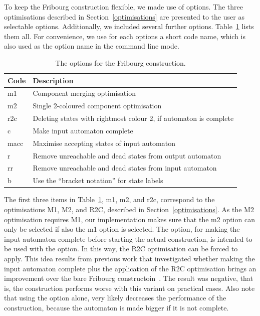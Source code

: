To keep the Fribourg construction flexible, we made use of options. The three optimisations described in Section~\ref{optimisations} are presented to the user as selectable options. Additionally, we included several further options. Table~\ref{goal_fribourg_options} lists them all. For convenience, we use for each options a short code name, which is also used as the option name in the command line mode.

\begin{table}
\caption{The options for the Fribourg construction.}
\begin{center}
\begin{tabular}{|l|l|}
\hline
Code & Description \\ \hline
m1 & Component merging optimisation \\ \hline
m2 & Single 2-coloured component optimisation \\ \hline
r2c & Deleting states with rightmost colour 2, if automaton is complete \\ \hline
c & Make input automaton complete \\ \hline
macc & Maximise accepting states of input automaton \\ \hline
r & Remove unreachable and dead states from output automaton \\ \hline
rr & Remove unreachable and dead states from input automaton \\ \hline
b & Use the ``bracket notation'' for state labels \\ \hline
\end{tabular}
\end{center}
\label{goal_fribourg_options}
\end{table}

The first three items in Table~\ref{goal_fribourg_options}, m1, m2, and r2c, correspond to the optimisations M1, M2, and R2C, described in Section~\ref{optimisations}. As the M2 optimisation requires M1, our implementation makes sure that the m2 option can only be selected if also the m1 option is selected. The  option, for making the input automaton complete before starting the actual construction, is intended to be used with the  option. In this way, the R2C optimisation can be forced to apply. This idea results from previous work that investigated whether making the input automaton complete plus the application of the R2C optimisation brings an improvement over the bare Fribourg constructoin~\cite{2013_bsc_goettel}. The result was negative, that is, the construction performs worse with this variant on practical cases. Also note that using the  option alone, very likely decreases the performance of the construction, because the automaton is made bigger if it is not complete.

